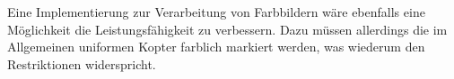 		Eine Implementierung zur Verarbeitung von Farbbildern wäre ebenfalls eine Möglichkeit die Leistungsfähigkeit zu verbessern. Dazu müssen allerdings die im Allgemeinen uniformen Kopter farblich markiert werden, was wiederum den Restriktionen widerspricht. 

